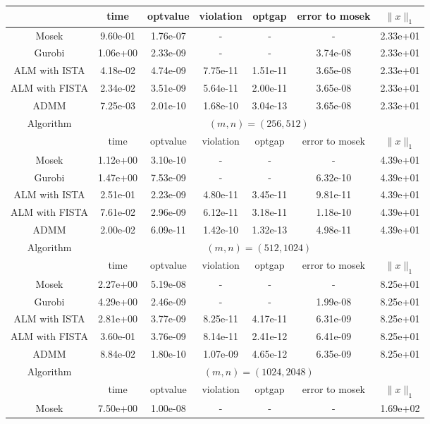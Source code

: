 \documentclass{article}
\begin{document}
\begin{table}[H]
\begin{tabular}{|c|c|c|c|c|c|c|}
 &  time & optvalue & violation & optgap & error to mosek& $\|x\|_1 $\\\hline
Mosek & 9.60e-01 & 1.76e-07 &- & - & - & 2.33e+01\\\hline
Gurobi & 1.06e+00 & 2.33e-09 & - & - & 3.74e-08 & 2.33e+01\\\hline
ALM with ISTA & 4.18e-02 & 4.74e-09 & 7.75e-11 & 1.51e-11 &3.65e-08 & 2.33e+01 \\\hline
ALM with FISTA & 2.34e-02 & 3.51e-09 & 5.64e-11 & 2.00e-11 &3.65e-08 & 2.33e+01 \\\hline
ADMM & 7.25e-03 & 2.01e-10 & 1.68e-10 & 3.04e-13&3.65e-08 & 2.33e+01  \\\hline
 \multirow{2}{*}{Algorithm }& \multicolumn{6}{c|}{$(m,n)=(256,512)$} \\\cline{2-7}
 &  time & optvalue & violation & optgap & error to mosek& $\|x\|_1 $\\\hline
Mosek & 1.12e+00 & 3.10e-10 &- & - & - & 4.39e+01\\\hline
Gurobi & 1.47e+00 & 7.53e-09 & - & - & 6.32e-10 & 4.39e+01\\\hline
ALM with ISTA & 2.51e-01 & 2.23e-09 & 4.80e-11 & 3.45e-11 &9.81e-11 & 4.39e+01 \\\hline
ALM with FISTA & 7.61e-02 & 2.96e-09 & 6.12e-11 & 3.18e-11 &1.18e-10 & 4.39e+01 \\\hline
ADMM & 2.00e-02 & 6.09e-11 & 1.42e-10 & 1.32e-13&4.98e-11 & 4.39e+01  \\\hline
 \multirow{2}{*}{Algorithm }& \multicolumn{6}{c|}{$(m,n)=(512,1024)$} \\\cline{2-7}
 &  time & optvalue & violation & optgap & error to mosek& $\|x\|_1 $\\\hline
Mosek & 2.27e+00 & 5.19e-08 &- & - & - & 8.25e+01\\\hline
Gurobi & 4.29e+00 & 2.46e-09 & - & - & 1.99e-08 & 8.25e+01\\\hline
ALM with ISTA & 2.81e+00 & 3.77e-09 & 8.25e-11 & 4.17e-11 &6.31e-09 & 8.25e+01 \\\hline
ALM with FISTA & 3.60e-01 & 3.76e-09 & 8.14e-11 & 2.41e-12 &6.41e-09 & 8.25e+01 \\\hline
ADMM & 8.84e-02 & 1.80e-10 & 1.07e-09 & 4.65e-12&6.35e-09 & 8.25e+01  \\\hline
 \multirow{2}{*}{Algorithm }& \multicolumn{6}{c|}{$(m,n)=(1024,2048)$} \\\cline{2-7}
 &  time & optvalue & violation & optgap & error to mosek& $\|x\|_1 $\\\hline
Mosek & 7.50e+00 & 1.00e-08 &- & - & - & 1.69e+02\\\hline

\end{tabular}
\end{table}
\end{document}
